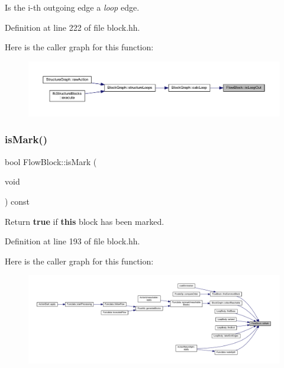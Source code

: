 Is the i-\/th outgoing edge a {\itshape loop} edge. 



Definition at line 222 of file block.\+hh.

Here is the caller graph for this function\+:
\nopagebreak
\begin{figure}[H]
\begin{center}
\leavevmode
\includegraphics[width=350pt]{class_flow_block_aec8b1d9c9c0fc5918dc1665a5161aea2_icgraph}
\end{center}
\end{figure}
\mbox{\label{class_flow_block_a1b2d32b7b1d9850f7244f8c8b3ce4d37}} 
\subsubsection{\texorpdfstring{isMark()}{isMark()}}
{\footnotesize\ttfamily bool Flow\+Block\+::is\+Mark (\begin{DoxyParamCaption}\item[{void}]{ }\end{DoxyParamCaption}) const\hspace{0.3cm}{\ttfamily [inline]}}



Return {\bfseries{true}} if {\bfseries{this}} block has been marked. 



Definition at line 193 of file block.\+hh.

Here is the caller graph for this function\+:
\nopagebreak
\begin{figure}[H]
\begin{center}
\leavevmode
\includegraphics[width=350pt]{class_flow_block_a1b2d32b7b1d9850f7244f8c8b3ce4d37_icgraph}
\end{center}
\end{figure}
\mbox{\label{class_flow_block_ab80d8989ba2b6e2046003367e478c951}} 
